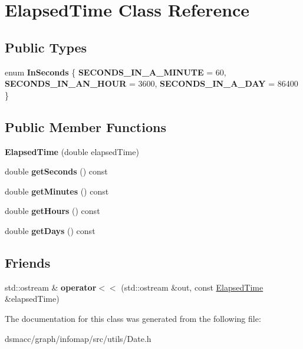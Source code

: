 \hypertarget{classElapsedTime}{}\section{Elapsed\+Time Class Reference}
\label{classElapsedTime}
\subsection*{Public Types}
\begin{DoxyCompactItemize}
\item 
\mbox{\label{classElapsedTime_a5d96ed5272965a69eae609df233c2d1d}} 
enum {\bfseries In\+Seconds} \{ {\bfseries S\+E\+C\+O\+N\+D\+S\+\_\+\+I\+N\+\_\+\+A\+\_\+\+M\+I\+N\+U\+TE} = 60, 
{\bfseries S\+E\+C\+O\+N\+D\+S\+\_\+\+I\+N\+\_\+\+A\+N\+\_\+\+H\+O\+UR} = 3600, 
{\bfseries S\+E\+C\+O\+N\+D\+S\+\_\+\+I\+N\+\_\+\+A\+\_\+\+D\+AY} = 86400
 \}
\end{DoxyCompactItemize}
\subsection*{Public Member Functions}
\begin{DoxyCompactItemize}
\item 
\mbox{\label{classElapsedTime_a0288e8601a361771d113239c4206904e}} 
{\bfseries Elapsed\+Time} (double elapsed\+Time)
\item 
\mbox{\label{classElapsedTime_ae53e4c1b0881062ea1a33c93540550d9}} 
double {\bfseries get\+Seconds} () const
\item 
\mbox{\label{classElapsedTime_a151fd60c2fff55e5fed6c1388b874f90}} 
double {\bfseries get\+Minutes} () const
\item 
\mbox{\label{classElapsedTime_ab42a4efde3a5ef624868378d3e390c3a}} 
double {\bfseries get\+Hours} () const
\item 
\mbox{\label{classElapsedTime_abecd5b2307c66f8bf619a48a59b2ce6a}} 
double {\bfseries get\+Days} () const
\end{DoxyCompactItemize}
\subsection*{Friends}
\begin{DoxyCompactItemize}
\item 
\mbox{\label{classElapsedTime_abb70b29d45ff802e88e8392017335775}} 
std\+::ostream \& {\bfseries operator$<$$<$} (std\+::ostream \&out, const \mbox{\hyperlink{classElapsedTime}{Elapsed\+Time}} \&elapsed\+Time)
\end{DoxyCompactItemize}


The documentation for this class was generated from the following file\+:\begin{DoxyCompactItemize}
\item 
dsmacc/graph/infomap/src/utils/Date.\+h\end{DoxyCompactItemize}
